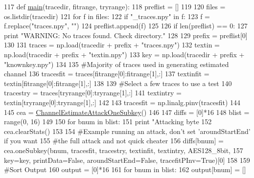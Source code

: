 \begin{DoxyCode}
117 \textcolor{keyword}{def }\hyperlink{namespacesoftware_1_1chipwhisperer_1_1analyzer_1_1attacks_1_1__channel__estimate__attack_a8a2b206889bacda130ce0bb83754ada8}{main}(tracedir, fitrange, tryrange):    
118     preflist = []
119 
120     files = os.listdir(tracedir)
121     \textcolor{keywordflow}{for} f \textcolor{keywordflow}{in} files:
122         \textcolor{keywordflow}{if} \textcolor{stringliteral}{"\_traces.npy"} \textcolor{keywordflow}{in} f:
123             f = f.replace(\textcolor{stringliteral}{"traces.npy"}, \textcolor{stringliteral}{""})
124             preflist.append(f)
125 
126     \textcolor{keywordflow}{if} len(preflist) == 0:
127         \textcolor{keywordflow}{print} \textcolor{stringliteral}{"WARNING: No traces found. Check directory."}
128 
129     prefix = preflist[0]
130 
131     traces = np.load(tracedir + prefix + \textcolor{stringliteral}{"traces.npy"})
132     textin = np.load(tracedir + prefix + \textcolor{stringliteral}{"textin.npy"})
133     key = np.load(tracedir + prefix + \textcolor{stringliteral}{"knownkey.npy"})
134     
135     \textcolor{comment}{#Majority of traces used in generating estimated channel}
136     tracesfit = traces[fitrange[0]:fitrange[1],:]
137     textinfit = textin[fitrange[0]:fitrange[1],:]
138 
139     \textcolor{comment}{#Select a few traces to use a test}
140     tracestry = traces[tryrange[0]:tryrange[1],:]
141     textintry = textin[tryrange[0]:tryrange[1],:]
142 
143     tracesfit = np.linalg.pinv(tracesfit)
144 
145     cea = \hyperlink{classsoftware_1_1chipwhisperer_1_1analyzer_1_1attacks_1_1__channel__estimate__attack_1_1ChannelEstimateAttackOneSubkey}{ChannelEstimateAttackOneSubkey}()
146 
147     diffs = [0]*16
148     blist = range(0, 16)
149 
150     \textcolor{keywordflow}{for} bnum \textcolor{keywordflow}{in} blist:
151         \textcolor{keywordflow}{print} \textcolor{stringliteral}{"Attacking byte %
152         cea.clearStats()
153 
154         \textcolor{comment}{#Example running an attack, don't set 'aroundStartEnd' if you want}
155         \textcolor{comment}{#the full attack and not quick cheater}
156         diffs[bnum] = cea.oneSubkey(bnum, tracesfit, tracestry, textinfit, textintry, AES128\_8bit,
157                       key=key, printData=\textcolor{keyword}{False}, aroundStartEnd=\textcolor{keyword}{False}, tracefitPInv=\textcolor{keyword}{True})[0]
158 
159     \textcolor{comment}{#Sort Output}
160     output = [0]*16
161     \textcolor{keywordflow}{for} bnum \textcolor{keywordflow}{in} blist:
162         output[bnum] = []
}
\end{DoxyCode}
